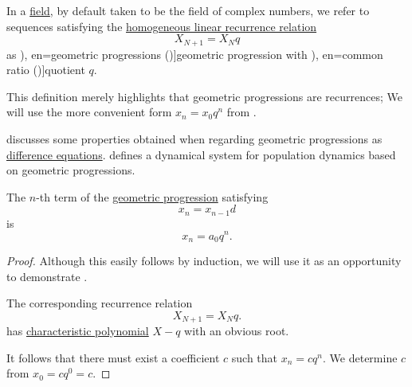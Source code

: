 \begin{definition}\label{def:geometric_progression}\mimprovised
  In a \hyperref[def:field]{field}, by default taken to be the field of complex numbers, we refer to sequences satisfying the \hyperref[def:homogeneous_linear_recurrence]{homogeneous linear recurrence relation}
  \begin{equation}\label{eq:def:geometric_progression/recurrence}
    X_{N+1} = X_N q
  \end{equation}
  as \term[ru=геометрическае прогрессии (\cite[144]{АлександровМаркушевичХинчинИПр1952ЭнциклопедияТом3}), en=geometric progressions (\cite[def. 2.4.2]{Rosen2019DiscreteMathematics})]{geometric progression} with \term[ru=знаменатель (прогрессии) (\cite[\S 227]{Киселёв2004Геометрия}), en=common ratio (\cite[def. 2.4.2]{Rosen2019DiscreteMathematics})]{quotient} \( q \).
\end{definition}
\begin{comments}
  \item This definition merely highlights that geometric progressions are recurrences; We will use the more convenient form \( x_n = x_0 q^n \) from .

  \item {} discusses some properties obtained when regarding geometric progressions as \hyperref[def:difference_equation]{difference equations}.  defines a dynamical system for population dynamics based on geometric progressions.
\end{comments}

\begin{proposition}\label{thm:geometric_progression_unwinding}
  The \( n \)-th term of the \hyperref[def:arithmetic_progression]{geometric progression} satisfying
  \begin{equation*}
    x_n = x_{n-1} d
  \end{equation*}
  is
  \begin{equation*}
    x_n = a_0 q^n.
  \end{equation*}
\end{proposition}
\begin{proof}
  Although this easily follows by induction, we will use it as an opportunity to demonstrate .

  The corresponding recurrence relation
  \begin{equation*}
    X_{N+1} = X_N q.
  \end{equation*}
  has \hyperref[def:linear_recurrence_characteristic_polynomial]{characteristic polynomial} \( X - q \) with an obvious root.

  It follows that there must exist a coefficient \( c \) such that \( x_n = cq^n \). We determine \( c \) from \( x_0 = c q^0 = c \).
\end{proof}

